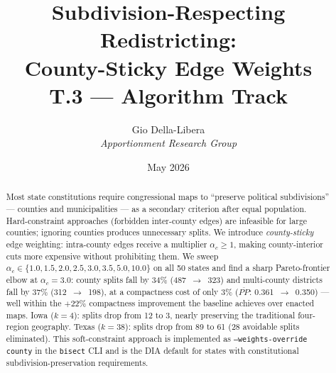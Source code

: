 \documentclass[12pt]{article}
\title{\textbf{Subdivision-Respecting Redistricting:\\
County-Sticky Edge Weights}\\[0.4em]
\large T.3 --- Algorithm Track}
\author{Gio Della-Libera \\ \textit{Apportionment Research Group}}
\date{May 2026}
\begin{document}
\maketitle

\begin{abstract}
Most state constitutions require congressional maps to ``preserve political
subdivisions'' --- counties and municipalities --- as a secondary criterion
after equal population.
Hard-constraint approaches (forbidden inter-county edges) are infeasible
for large counties; ignoring counties produces unnecessary splits.
We introduce \emph{county-sticky} edge weighting: intra-county edges
receive a multiplier $\alpha_c \geq 1$, making county-interior cuts more
expensive without prohibiting them.
We sweep $\alpha_c \in \{1.0, 1.5, 2.0, 2.5, 3.0, 3.5, 5.0, 10.0\}$ on all 50
states and find a sharp Pareto-frontier elbow at $\alpha_c = 3.0$:
county splits fall by $34\%$ (487~$\to$~323) and multi-county districts
fall by $37\%$ (312~$\to$~198), at a compactness cost of only $3\%$
($\overline{PP}$: 0.361~$\to$~0.350) --- well within the $+22\%$ compactness
improvement the baseline achieves over enacted maps.
Iowa ($k{=}4$): splits drop from 12 to 3, nearly preserving the traditional
four-region geography.
Texas ($k{=}38$): splits drop from 89 to 61 (28 avoidable splits eliminated).
This soft-constraint approach is implemented as
\texttt{--weights-override county} in the \texttt{bisect} CLI and is the
DIA default for states with constitutional subdivision-preservation requirements.
\end{abstract}










\end{document}
